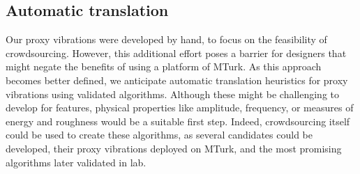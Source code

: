 \subsection{Automatic translation }
Our proxy vibrations were developed by hand, to focus on the feasibility of crowdsourcing.
However, this additional effort poses a barrier for designers that might negate the benefits of using a platform of MTurk.
As this approach becomes better defined, we anticipate automatic translation heuristics for proxy vibrations using validated algorithms.
Although these might be challenging to develop for %
 features, physical properties like amplitude, frequency, or measures of energy and roughness would be a suitable first step.
Indeed, crowdsourcing itself could be used to create these algorithms, as several candidates could be developed, their proxy vibrations deployed on MTurk, and the most promising algorithms later validated in lab.



        
       
        
        
        

        
        
        
